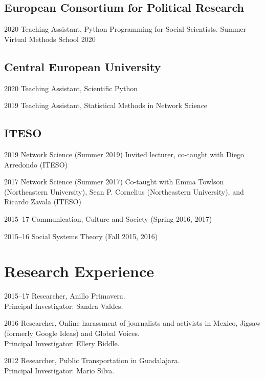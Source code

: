 \documentclass{academiccv}
\begin{document}
\subsection*{European Consortium for Political Research}
\begin{tablist}
	\item[2020] \tab Teaching Assistant, Python Programming for Social Scientists. Summer Virtual Methods School 2020
\end{tablist}

\subsection*{Central European University}
\begin{tablist}
	\item[2020] \tab Teaching Assistant, Scientific Python
	\item[2019] \tab Teaching Assistant, Statistical Methods in Network Science
\end{tablist}

\subsection*{ITESO}
\begin{tablist}
	\item[2019] \tab Network Science (Summer 2019) Invited lecturer, co-taught with Diego Arredondo (ITESO)
	\item[2017]	\tab Network Science (Summer 2017) Co-taught with Emma Towlson (Northeastern University), Sean P. Cornelius (Northeastern University), and Ricardo Zavala (ITESO)
	\item [2015--17]\tab Communication, Culture and Society (Spring 2016, 2017)
	\item [2015--16]\tab Social Systems Theory (Fall 2015, 2016)
\end{tablist} 

\section*{Research Experience}
\begin{tablist}
	\item[2015--17] 	\tab Researcher, Anillo Primavera. \\
									Principal Investigator: Sandra Valdes.
	\item[2016] 	\tab Researcher, Online harassment of journalists and activists in Mexico, Jigsaw (formerly Google Ideas) and Global Voices. \\
								Principal Investigator: Ellery Biddle.
	\item[2012] \tab Researcher, Public Transportation in Guadalajara. \\
							Principal Investigator: Mario Silva.
\end{tablist}
\end{document}
